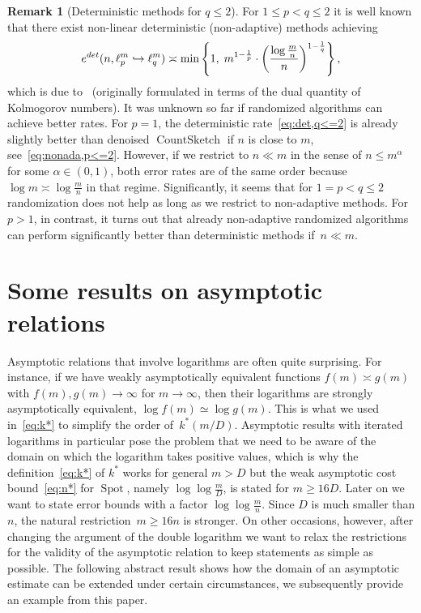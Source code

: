 \documentclass[12pt]{article}
\theoremstyle{plain}
\theoremstyle{definition}
\newtheorem{remark}[theorem]{Remark}
\newcommand{\deter}{\textup{det}}
\newcommand{\embed}{\hookrightarrow}
\DeclareMathOperator{\spot}{Spot}
\DeclareMathOperator{\countsketch}{CountSketch}
\begin{document}
\begin{remark}[Deterministic methods for $q \leq 2$]
    For \mbox{$1 \leq p < q \leq 2$} it is well known that there exist non-linear deterministic (non-adaptive) methods achieving
    \begin{equation} \label{eq:det,q<=2}
        e^{\deter}(n, \ell_p^m \embed \ell_q^m)
            \asymp \min\left\{1,\; 
                m^{1 - \frac{1}{p}} \cdot \left(\frac{\log \frac{m}{n}}{n}\right)^{1 - \frac{1}{q}}
                        \right\},
    \end{equation}
    which is due to~\cite{Ka74,GG84} (originally formulated in terms of the dual quantity of Kolmogorov numbers).
    It was unknown so far if randomized algorithms can achieve better rates.
    For $p=1$, the deterministic rate~\eqref{eq:det,q<=2} is already slightly better than denoised $\countsketch$ if $n$ is close to $m$, see~\eqref{eq:nonada,p<=2}.
    However, if we restrict to $n \ll m$
    in the sense of $n \leq m^\alpha$ for some $\alpha \in (0,1)$,
    both error rates are of the same order
    because $\log m \asymp \log \frac{m}{n}$ in that regime.
    Significantly, it seems that for $1=p < q \leq 2$ randomization does not help as long as we restrict to non-adaptive methods.
    For $p > 1$, in contrast, it turns out that already non-adaptive randomized algorithms can perform significantly better than deterministic methods if~$n\ll m$.
\end{remark}

\appendix


\section{Some results on asymptotic relations}
\label{app:asymp}

Asymptotic relations that involve logarithms are often quite surprising.
For instance, if we have weakly asymptotically equivalent functions $f(m) \asymp g(m)$ with $f(m),g(m) \to \infty$ for $m \to \infty$,
then their logarithms are strongly asymptotically equivalent, $\log f(m) \simeq \log g(m)$.
This is what we used in~\eqref{eq:k*} to simplify the order of~$k^\ast(m/D)$.
Asymptotic results with iterated logarithms in particular pose the problem that we need to be aware of the domain on which the logarithm takes positive values,
which is why the definition~\eqref{eq:k*} of $k^\ast$ works for general $m > D$
but the weak asymptotic cost bound~\eqref{eq:n*} for $\spot$, namely $\log \log \frac{m}{D}$, is stated for $m \geq 16D$.
Later on we want to state error bounds with a factor $\log \log \frac{m}{n}$.
Since $D$ is much smaller than $n$, the natural restriction~$m \geq 16n$ is stronger.
On other occasions, however, after changing the argument of the double logarithm we want to relax the restrictions for the validity of the asymptotic relation to keep statements as simple as possible.
The following abstract result shows how the domain of an asymptotic estimate can be extended under certain circumstances, we subsequently provide an example from this paper.
\end{document}
